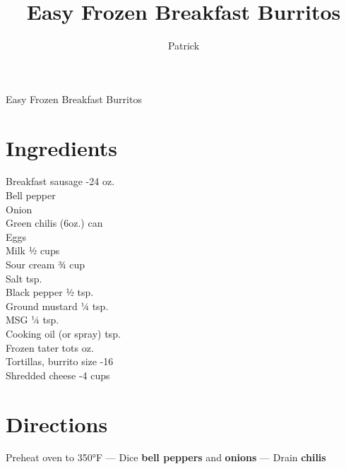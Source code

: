 \documentclass[11pt,letterpaper]{article}
\title{Easy Frozen Breakfast Burritos}
\author{Patrick }
\date{}
\begin{document}
\thispagestyle{empty}

\begin{center}
\huge{Easy Frozen Breakfast Burritos}
\end{center}
\normalsize

\section*{Ingredients}
\setlength{\columnsep}{20pt}
\begin{multicols}{2}
\noindent
    Breakfast sausage -24 oz. \\
    Bell pepper  \\
    Onion  \\
    Green chilis  (6oz.) can \\
    Eggs  \\
    Milk  ½ cups \\
    \columnbreak
    Sour cream \dotfill ¾ cup \\
    Salt  tsp. \\
    Black pepper \dotfill ½ tsp. \\
    Ground mustard \dotfill ¼ tsp. \\
    MSG \dotfill ¼ tsp. \\
    Cooking oil (or spray)  tsp. \\
    Frozen tater tots  oz. \\
    Tortillas, burrito size -16 \\
    Shredded cheese -4 cups
\end{multicols}

\section*{Directions}
\noindent
Preheat oven to 350°F --- Dice \textbf{bell peppers} and \textbf{onions} --- Drain \textbf{chilis}
\end{document}
